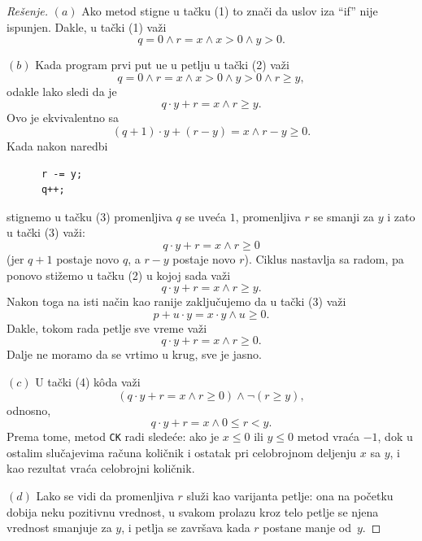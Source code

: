 \begin{proof}[Re\v senje]
  $(a)$
  Ako metod stigne u ta\v cku (1) to zna\v ci da uslov iza \enquote{if} nije ispunjen. Dakle, u ta\v cki (1)
  va\v zi
  $$
    q = 0 \land r = x \land x > 0 \land y > 0.
  $$

  $(b)$
  Kada program prvi put u\dj e u petlju u ta\v cki (2) va\v zi
  $$
    q = 0 \land r = x \land x > 0 \land y > 0 \land r \ge y,
  $$
  odakle lako sledi da je
  $$
    q \cdot y + r = x \land r \ge y.
  $$
  Ovo je ekvivalentno sa
  $$
    (q + 1) \cdot y + (r - y) = x \land r - y \ge 0.
  $$
  Kada nakon naredbi
  {\small
  \begin{verbatim}
      r -= y;
      q++;
  \end{verbatim}
  }
  \noindent
  stignemo u ta\v cku (3) promenljiva $q$ se uve\'ca $1$, promenljiva $r$ se smanji za $y$ i zato u ta\v cki (3) va\v zi:
  $$
    q \cdot y + r = x \land r \ge 0
  $$
  (jer $q + 1$ postaje novo $q$, a $r - y$ postaje novo $r$). Ciklus nastavlja sa radom, pa ponovo sti\v zemo u ta\v cku (2)
  u kojoj sada va\v zi
  $$
    q \cdot y + r = x \land r \ge y.
  $$
  Nakon toga na isti na\v cin kao ranije zaklju\v cujemo da u ta\v cki (3) va\v zi
  $$
    p + u\cdot y = x \cdot y \land u \ge 0.
  $$
  Dakle, tokom rada petlje sve vreme va\v zi
  $$
    q \cdot y + r = x \land r \ge 0.
  $$
  Dalje ne moramo da se vrtimo u krug, sve je jasno.
  
  $(c)$
  U ta\v cki (4) k\^oda va\v zi
  $$
    (q \cdot y + r = x \land r \ge 0) \land \lnot(r \ge y),
  $$
  odnosno,
  $$
    q \cdot y + r = x \land 0 \le r < y.
  $$
  Prema tome, metod \verb"CK" radi slede\'ce: ako je $x \le 0$ ili $y \le 0$ metod vra\'ca $-1$, dok u ostalim slu\v cajevima
  ra\v cuna koli\v cnik i ostatak pri celobrojnom deljenju $x$ sa $y$, i kao rezultat vra\'ca celobrojni koli\v cnik.

  $(d)$
  Lako se vidi da promenljiva $r$ slu\v zi kao varijanta petlje: ona na po\v cetku dobija neku pozitivnu vrednost,
  u svakom prolazu kroz telo petlje se njena vrednost smanjuje za $y$, i petlja se zavr\v sava kada $r$ postane manje od~$y$.
\end{proof}

